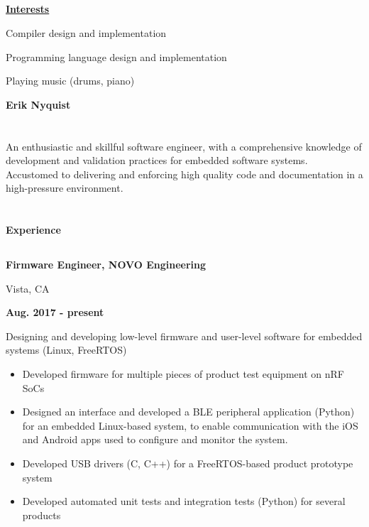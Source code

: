 \documentclass[6pt]{article}
\begin{document}
\begin{minipage}{15em}
\subsection*{}
{\underline{\textbf{Interests}}}

\noindent
\begin{itemize}
{\small \raggedright
    \item Compiler design and implementation
    \item Programming language design and implementation
    \item Playing music (drums, piano)
}
\end{itemize}
\end{minipage}
%
%
\begin{minipage}{35em}
%
%
{\Huge \bfseries Erik Nyquist}
\section*{}

An enthusiastic and skillful software engineer, with a comprehensive knowledge of
development and validation practices for embedded software systems. Accustomed to
delivering and enforcing high quality code and documentation in a high-pressure
environment.

\section*{}
{\Large \bfseries Experience}

\titlerule
%
%
\subsection*{}
\begin{minipage}{20em}
{\bfseries Firmware Engineer, NOVO Engineering

Vista, CA}
\end{minipage}
\hfill
\begin{minipage}{10em}
{\bfseries Aug. 2017 - present}
\end{minipage}
\break
\break
Designing and developing low-level firmware and user-level software for embedded
systems (Linux, FreeRTOS)
\begin{itemize}
    \item Developed firmware for multiple pieces of product test equipment on nRF SoCs
    \item Designed an interface and developed a BLE peripheral application (Python) for an
          embedded Linux-based system, to enable communication with the iOS and Android
          apps used to configure and monitor the system.
    \item Developed USB drivers (C, C++) for a FreeRTOS-based product prototype system
    \item Developed automated unit tests and integration tests (Python) for several products
\end{itemize}
\dotfill


\end{minipage}
\end{document}
